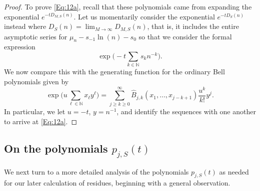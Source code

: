 \documentclass[letterpaper,10pt]{amsart}
\numberwithin{equation}{section}
\begin{document}
\begin{proof}
To prove \eqref{Eq:12a}, recall that these polynomials came from expanding the exponential $e^{-t D_{M,S}(n)}$. Let us momentarily consider the exponential $e^{-t D_S(n)}$ instead where $D_S(n)=\lim_{M\to\infty} D_{M,S}(n)$, that is, it includes the entire asymptotic series for $\mu_n-s_{-1}\ln(n) -s_0$ so that we consider the formal expression
\begin{equation}\label{Eq:17a}
\exp\bigg(-t\sum_{k\in\mathbb{N}}s_kn^{-k}\bigg).
\end{equation}
We now compare this with the generating function for the ordinary Bell polynomials given by
\begin{equation}\label{Eq:BellGena}
\exp\bigg( u\sum_{\ell\in\mathbb{N}} x_\ell y^\ell\bigg)=\sum_{j\geq k\geq 0}^\infty \widehat{B}_{j,k}(x_1,\dots,x_{j-k+1})\frac{u^k}{k!}y^j.
\end{equation}
In particular, we let $u=-t$, $y=n^{-1}$, and identify the sequences with one another to arrive at \eqref{Eq:12a}.
\end{proof}

\subsection{On the polynomials \texorpdfstring{$p_{j,S}(t)$}{p}}\label{Sect:poly}

We next turn to a more detailed analysis of the polynomials $p_{j,S}(t)$ as needed for our later calculation of residues, beginning with a general observation.
\end{document}

